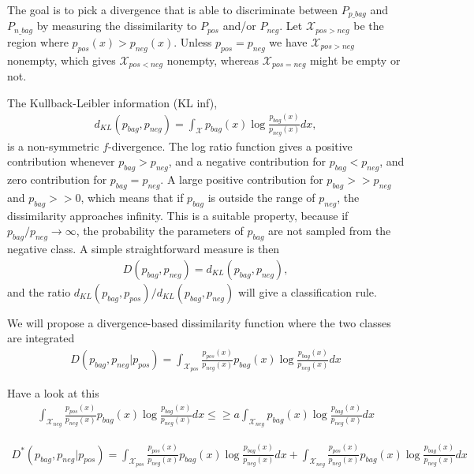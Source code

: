 The goal is to pick a divergence that is able to discriminate between $P_{p \_ bag}$ and $P_{n \_ bag}$ by measuring the dissimilarity to $P_{pos}$ and/or $P_{neg}$.
Let $\mathcal{X}_{pos > neg}$ be the region where $p_{pos}(x) > p_{neg}(x)$. 
Unless $p_{pos} = p_{neg}$ we have $\mathcal{X}_{pos > neg}$ nonempty, which gives $\mathcal{X}_{pos < neg}$ nonempty, whereas $\mathcal{X}_{pos = neg}$ might be empty or not. 

The Kullback-Leibler information (KL inf),
\begin{align}
  d_{KL}(p_{bag},p_{neg}) = \int_\mathcal{X} p_{bag}(x) \log \frac{p_{bag}(x)}{p_{neg}(x)} dx,
\end{align}
is a non-symmetric $f$-divergence.
The log ratio function gives a positive contribution whenever $p_{bag}>p_{neg}$, and a negative contribution for $p_{bag}<p_{neg}$, and zero contribution for $p_{bag} = p_{neg}$.
A large positive contribution for $p_{bag} >> p_{neg}$ and $p_{bag} >> 0$, which means that if $p_{bag}$ is outside the range of $p_{neg}$, the dissimilarity approaches infinity. 
This is a suitable property, because if $p_{bag}/p_{neg} \rightarrow \infty$, the probability the parameters of $p_{bag}$ are not sampled from the negative class. 
A simple straightforward measure is then
\begin{align}
  D(p_{bag},p_{neg}) = d_{KL} (p_{bag},p_{neg}),
\end{align}
and the ratio $d_{KL} (p_{bag},p_{pos})/d_{KL} (p_{bag},p_{neg})$ will give a classification rule.

We will propose a divergence-based dissimilarity function where the two classes are integrated
\begin{align}
  D(p_{bag},p_{neg}|p_{pos}) = \int_{\mathcal{X}_{pos}} \frac{p_{pos}(x)}{p_{neg}(x)} p_{bag}(x) \log \frac{p_{bag}(x)}{p_{neg}(x)} dx
\end{align}

{\color{red} Have a look at this
\begin{align}
  \int_{\mathcal{X}_{neg}} \frac{p_{pos}(x)}{p_{neg}(x)} p_{bag}(x) \log \frac{p_{bag}(x)}{p_{neg}(x)} dx \leq \geq a \int_{\mathcal{X}_{neg}} p_{bag}(x) \log \frac{p_{bag}(x)}{p_{neg}(x)} dx
\end{align}
}

\begin{align}
  D^*(p_{bag},p_{neg}|p_{pos}) = \int_{\mathcal{X}_{pos}} \frac{p_{pos}(x)}{p_{neg}(x)} p_{bag}(x) \log \frac{p_{bag}(x)}{p_{neg}(x)} dx
						+ \int_{\mathcal{X}_{neg}} \frac{p_{pos}(x)}{p_{neg}(x)} p_{bag}(x) \log \frac{p_{bag}(x)}{p_{neg}(x)} dx
\end{align}

